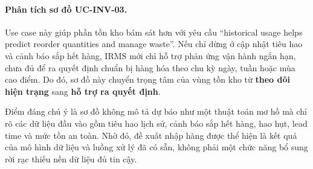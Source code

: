 \paragraph{Phân tích sơ đồ UC-INV-03.}

Use case này giúp phần tồn kho bám sát hơn với yêu cầu \enquote{historical usage helps predict reorder quantities and manage waste}. Nếu chỉ dừng ở cập nhật tiêu hao và cảnh báo sắp hết hàng, IRMS mới chỉ hỗ trợ phản ứng vận hành ngắn hạn, chưa đủ để ra quyết định chuẩn bị hàng hóa theo chu kỳ ngày, tuần hoặc mùa cao điểm. Do đó, sơ đồ này chuyển trọng tâm của vùng tồn kho từ \textbf{theo dõi hiện trạng} sang \textbf{hỗ trợ ra quyết định}.

Điểm đáng chú ý là sơ đồ không mô tả dự báo như một thuật toán mơ hồ mà chỉ rõ các dữ liệu đầu vào gồm tiêu hao lịch sử, cảnh báo sắp hết hàng, hao hụt, lead time và mức tồn an toàn. Nhờ đó, đề xuất nhập hàng được thể hiện là kết quả của mô hình dữ liệu và luồng xử lý đã có sẵn, không phải một chức năng bổ sung rời rạc thiếu nền dữ liệu đủ tin cậy.


